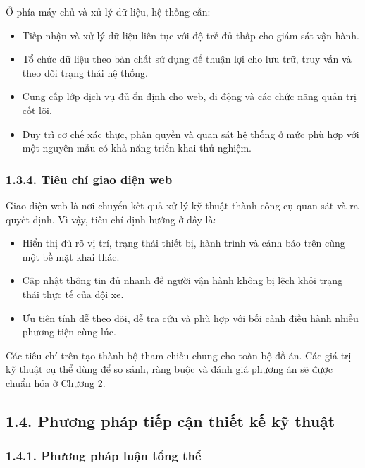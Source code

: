 \documentclass[a4paper]{extarticle}
\providecommand{\tightlist}{%
  \setlength{\itemsep}{0pt}\setlength{\parskip}{0pt}}
\begin{document}
Ở phía máy chủ và xử lý dữ liệu, hệ thống cần:

\begin{itemize}
\tightlist
\item
  Tiếp nhận và xử lý dữ liệu liên tục với độ trễ đủ thấp cho giám sát
  vận hành.
\item
  Tổ chức dữ liệu theo bản chất sử dụng để thuận lợi cho lưu trữ, truy
  vấn và theo dõi trạng thái hệ thống.
\item
  Cung cấp lớp dịch vụ đủ ổn định cho web, di động và các chức năng quản
  trị cốt lõi.
\item
  Duy trì cơ chế xác thực, phân quyền và quan sát hệ thống ở mức phù hợp
  với một nguyên mẫu có khả năng triển khai thử nghiệm.
\end{itemize}

\subsubsection{1.3.4. Tiêu chí giao diện web}\label{tiuxeau-chuxed-giao-diux1ec7n-web}

Giao diện web là nơi chuyển kết quả xử lý kỹ thuật thành công cụ quan sát
và ra quyết định. Vì vậy, tiêu chí định hướng ở đây là:

\begin{itemize}
\tightlist
\item
  Hiển thị đủ rõ vị trí, trạng thái thiết bị, hành trình và cảnh báo trên
  cùng một bề mặt khai thác.
\item
  Cập nhật thông tin đủ nhanh để người vận hành không bị lệch khỏi trạng
  thái thực tế của đội xe.
\item
  Ưu tiên tính dễ theo dõi, dễ tra cứu và phù hợp với bối cảnh điều hành
  nhiều phương tiện cùng lúc.
\end{itemize}

Các tiêu chí trên tạo thành bộ tham chiếu chung cho toàn bộ đồ án. Các
giá trị kỹ thuật cụ thể dùng để so sánh, ràng buộc và đánh giá phương án
sẽ được chuẩn hóa ở Chương 2.


\subsection{1.4. Phương pháp tiếp cận thiết kế kỹ thuật}\label{phux1b0ux1a1ng-phuxe1p-tiux1ebfp-cux1eadn-thiux1ebft-kux1ebf-kux1ef9-thuux1eadt}

\subsubsection{1.4.1. Phương pháp luận tổng thể}\label{phux1b0ux1a1ng-phuxe1p-luux1eadn-tux1ed5ng-thux1ec3}
\end{document}
